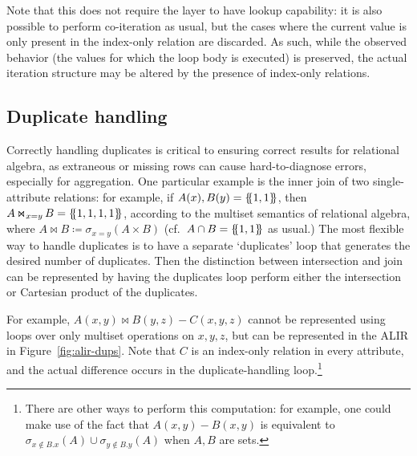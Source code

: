 \documentclass[acmsmall,screen,nonacm]{acmart}\settopmatter{printfolios=true,printccs=false,printacmref=false}
\newcommand*{\lB}{\{\mskip-5mu\{}
\newcommand*{\rB}{\}\mskip-5mu\}}
\DeclareMathOperator*{\ijoin}{\Join}
\begin{document}
Note that this does not require the layer to have lookup capability:
it is also possible to perform co-iteration as usual, but the cases where
the current value is only present in the index-only relation are discarded.
As such, while the observed behavior (the values for which the
loop body is executed) is preserved, the actual iteration structure may be
altered by the presence of index-only relations.

\subsection{Duplicate handling}
\label{subsec:duplicate-handling}
Correctly handling duplicates is critical to ensuring correct results
for relational algebra, as extraneous or missing rows can cause
hard-to-diagnose errors, especially for aggregation. One particular example is the inner join of two single-attribute relations:
for example, if $A(x), B(y) = \lB 1, 1 \rB$, then
$A \ijoin_{x=y} B = \lB 1, 1, 1, 1 \rB$, according to the multiset
semantics of relational algebra, where $A \ijoin B \coloneqq
\sigma_{x=y}(A \times B)$ (cf.\ $A \cap B = \lB 1, 1 \rB$ as usual.)
The most flexible way to handle duplicates is to have a separate `duplicates' loop that generates the desired number
of duplicates. Then the distinction between intersection and join can be represented by having the duplicates loop perform either the intersection or Cartesian product of the duplicates.

For example, $A(x, y) \ijoin B(y, z) - C(x, y, z)$
cannot be represented using loops over only
multiset operations on $x, y, z$,
but can be represented in the ALIR in Figure~\ref{fig:alir-dups}.
Note that $C$ is an index-only relation
in every attribute, and the actual difference occurs in the
duplicate-handling loop.\footnote{There are other ways to perform this computation:
for example, one could make use of the fact that $A(x, y) - B(x, y)$
is equivalent to $\sigma_{x \notin B.x}(A) \cup \sigma_{y \notin B.y}(A)$ when $A, B$ are sets.}
\end{document}
